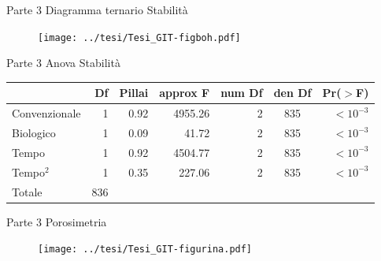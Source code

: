 \documentclass[10pt]{beamer}
\begin{document}
\begin{frame}[label=distribuzione]{Parte 3 \small{Diagramma ternario Stabilità}}
  \hyperlink{finale}{}
  
  \begin{figure}
    \texttt{[image: ../tesi/Tesi\_GIT-figboh.pdf]}
  \end{figure}
\end{frame}



\begin{frame}[label=Anova]{Parte 3 \small{Anova Stabilità}}
  \hyperlink{Composizionale}{}
  \footnotesize
  \begin{table}
    \centering
    \begin{tabular}{lrrrrcr}
      \hline
      & Df&Pillai& approx F & num Df & den Df & Pr($>$F) \\ 
      \hline
      Convenzionale & 1 & 0.92 & 4955.26  &      2 &    835 & $<10^{-3}$\\ 
      Biologico     & 1 & 0.09 & 41.72    &      2 &    835 & $<10^{-3}$\\ 
      Tempo         & 1 & 0.92 & 4504.77  &      2 &    835 & $<10^{-3}$\\ 
      Tempo$^2$     & 1 & 0.35 & 227.06   &      2 &    835 & $<10^{-3}$\\ 
      Totale        & 836 &    &          &        &        &          \\ 
      \hline
    \end{tabular}
  \end{table}
\end{frame}

\begin{frame}[label=Porosimetria]{Parte 3 \small{Porosimetria}}
  \hyperlink{finale}{}
  
  \begin{figure}
    \texttt{[image: ../tesi/Tesi\_GIT-figurina.pdf]}
  \end{figure}
\end{frame}
\end{document}
